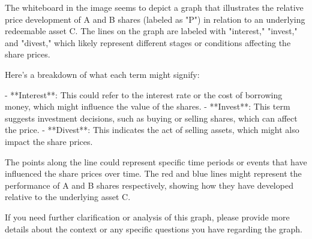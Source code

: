 The whiteboard in the image seems to depict a graph that illustrates the relative price development of A and B shares (labeled as "P") in relation to an underlying redeemable asset C. The lines on the graph are labeled with "interest," "invest," and "divest," which likely represent different stages or conditions affecting the share prices.

Here's a breakdown of what each term might signify:

- **Interest**: This could refer to the interest rate or the cost of borrowing money, which might influence the value of the shares.
- **Invest**: This term suggests investment decisions, such as buying or selling shares, which can affect the price.
- **Divest**: This indicates the act of selling assets, which might also impact the share prices.

The points along the line could represent specific time periods or events that have influenced the share prices over time. The red and blue lines might represent the performance of A and B shares respectively, showing how they have developed relative to the underlying asset C.

If you need further clarification or analysis of this graph, please provide more details about the context or any specific questions you have regarding the graph.